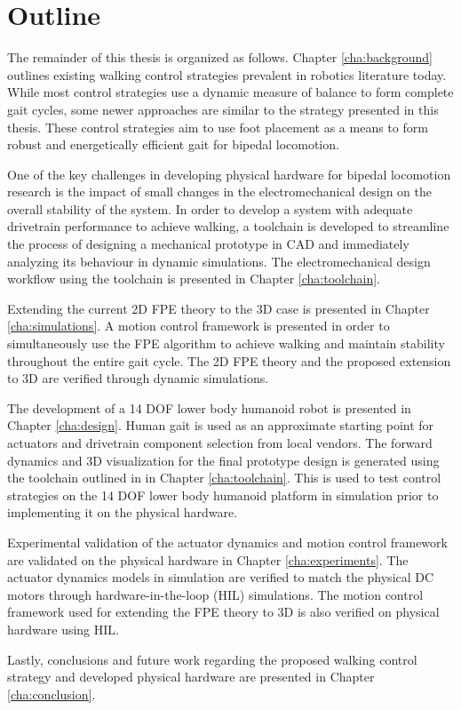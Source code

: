 \section{Outline} %
\label{sec:outline}
The remainder of this thesis is organized as follows. Chapter \ref{cha:background} outlines existing walking control strategies prevalent in robotics literature today. While most control strategies use a dynamic measure of balance to form complete gait cycles, some newer approaches are similar to the strategy presented in this thesis. These control strategies aim to use foot placement as a means to form robust and energetically efficient gait for bipedal locomotion. 

One of the key challenges in developing physical hardware for bipedal locomotion research is the impact of small changes in the electromechanical design on the overall stability of the system. In order to develop a system with adequate drivetrain performance to achieve walking, a toolchain is developed to streamline the process of designing a mechanical prototype in CAD and immediately analyzing its behaviour in dynamic simulations. The electromechanical design workflow using the toolchain is presented in Chapter \ref{cha:toolchain}.

Extending the current 2D FPE theory to the 3D case is presented in Chapter \ref{cha:simulations}. A motion control framework is presented in order to simultaneously use the FPE algorithm to achieve walking and maintain stability throughout the entire gait cycle. The 2D FPE theory and the proposed extension to 3D are verified through dynamic simulations. 

The development of a 14 DOF lower body humanoid robot is presented in Chapter \ref{cha:design}. Human gait is used as an approximate starting point for actuators and drivetrain component selection from local vendors. The forward dynamics and 3D visualization for the final prototype design is generated using the toolchain outlined in in Chapter \ref{cha:toolchain}. This is used to test control strategies on the 14 DOF lower body humanoid platform in simulation prior to implementing it on the physical hardware. 

Experimental validation of the actuator dynamics and motion control framework are validated on the physical hardware in Chapter \ref{cha:experiments}. The actuator dynamics models in simulation are verified to match the physical DC motors through hardware-in-the-loop (HIL) simulations. The motion control framework used for extending the FPE theory to 3D is also verified on physical hardware using HIL.  

Lastly, conclusions and future work regarding the proposed walking control strategy and developed physical hardware are presented in Chapter \ref{cha:conclusion}. 

